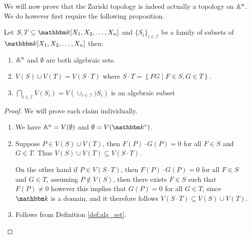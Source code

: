 We will now prove that the Zariski topology is indeed actually a topology on $\mathbb{A}^{n}$. We do however first require the following proposition.
\begin{proposition}\label{prop:closed_sets_zariski}
  Let $S, T \subseteq \pols$ and $\{S_{i}\}_{i \in \mathcal{I}}$ be a family of subsets of $\pols$ then:
  \begin{enumerate}
    \item $\mathbb{A}^{n}$ and $\emptyset$ are both algebraic sets. \label{prop:closed_sets_zariski:1}
    \item $V(S) \cup V(T) = V(S \cdot T)$ where $S \cdot T = \left\{F G \mid F \in S, G \in T\right\}$. \label{prop:closed_sets_zariski:2}
    \item $\bigcap_{i \in \mathcal{I}} V(S_{i}) = V\left(\cup_{i \in \mathcal{I}})S_{i}\right)$ is an algebraic subset \label{prop:closed_sets_zariski_intersection}\label{prop:closed_sets_zariski:3}
  \end{enumerate}
\end{proposition}
\begin{proof} We will prove each claim individually.
  \begin{enumerate}
      \item We have $\mathbb{A}^{n} = V(\emptyset)$ and $\emptyset = V(\K^{*})$.
      \item Suppose $P \in V(S) \cup V(T)$, then $F(P) \cdot G(P) = 0$ for all $F \in S$ and $G \in T$. Thus $V(S) \cup V(T) \subseteq V(S \cdot T)$.

        On the other hand if $P \in V(S \cdot T)$, then $F(P) \cdot G(P) = 0$ for all $F \in S$ and $G \in T$, assuming $P \not \in V(S)$, then there exists $F \in S$ such that $F(P) \neq 0$ however this implies that $G(P) = 0$ for all $G \in T$, since $\K$ is a domain, and it therefore follows $V(S \cdot T) \subseteq V(S) \cup V(T)$.
      \item Follows from Definition \ref{def:alg_set}. \qedhere
  \end{enumerate}
\end{proof}


